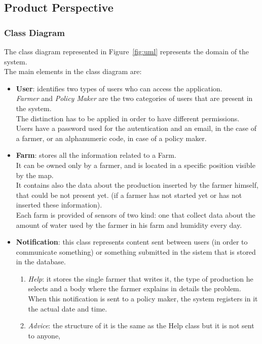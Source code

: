 \subsection{Product Perspective}
\subsubsection{Class Diagram}
The class diagram represented in Figure~\ref{fig:uml} represents the domain of the system. \\
The main elements in the class diagram are:
\begin{itemize}
    \item \textbf{User}: identifies two types of users who can access the application.\\
    \textsl{Farmer} and \textsl{Policy Maker} are the two categories of users that are present in the system. \\
    The distinction has to be applied in order to have different permissions.\\
    Users have a password used for the autentication and an email, in the case of a farmer, or an alphanumeric code, in case of a policy maker.
    \item \textbf{Farm}: stores all the information related to a Farm.\\ 
    It can be owned only by a farmer, and is located in a specific position visible by the map. \\
    It contains also the data about the production inserted by the farmer himself, that could be not present yet.
    (if a farmer has not started yet or has not inserted these information).\\
    Each farm is provided of sensors of two kind: one that collect data about the amount of water used by the farmer in his farm and humidity every day.\\
    \item \textbf{Notification}: this class represents content sent between users (in order to communicate something) or something submitted in the sistem that is stored in the database.
        \begin{enumerate}
            \item \textsl{Help}: it stores the single farmer that writes it, 
            the type of production he selects and a body where the farmer explains in details the problem.\\
            When this notification is sent to a policy maker, the system registers in it the actual date and time.
            \item \textsl{Advice}: the structure of it is the same as the Help class but it is not sent to anyone,

\end{enumerate}
\end{itemize}
